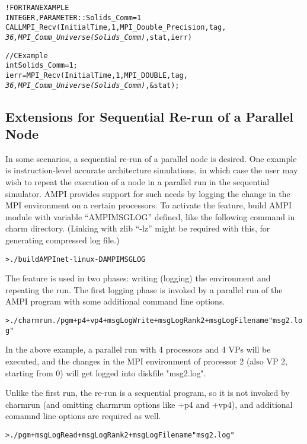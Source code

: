 \documentclass[10pt]{article}
\begin{document}
\begin{alltt}
!FORTRAN EXAMPLE
INTEGER , PARAMETER :: Solids_Comm = 1
CALL MPI_Recv(InitialTime, 1, MPI_Double_Precision, tag, 
              \emph{36, MPI_Comm_Universe(Solids_Comm)}, stat, ierr)

//C Example
int Solids_Comm = 1;
ierr = MPI_Recv(InitialTime, 1, MPI_DOUBLE, tag,
                \emph{36, MPI_Comm_Universe(Solids_Comm)}, &stat);
\end{alltt}

\subsection{Extensions for Sequential Re-run of a Parallel Node}
In some scenarios, a sequential re-run of a parallel node is desired. One
example is instruction-level accurate architecture simulations, in which case
the user may wish to repeat the execution of a node in a parallel run in the
sequential simulator. AMPI provides support for such needs by logging the change
in the MPI environment on a certain processors. To activate the feature, build 
AMPI module with variable ``AMPIMSGLOG'' defined, like the following command in
charm directory. (Linking with zlib ``-lz'' might be required with this, for
generating compressed log file.)

\begin{alltt}
> ./build AMPI net-linux -DAMPIMSGLOG
\end{alltt}

The feature is used in two phases: writing (logging) the environment and
repeating the run. The first logging phase is invoked by a parallel run of the
AMPI program with some additional command line options. 

\begin{alltt}
> ./charmrun ./pgm +p4 +vp4 +msgLogWrite +msgLogRank 2 +msgLogFilename "msg2.log"
\end{alltt}

In the above example, a parallel run with 4 processors and 4 VPs will be
executed, and the changes in the MPI environment of processor 2 (also VP 2,
starting from 0) will get logged into diskfile "msg2.log". 

Unlike the first run, the re-run is a sequential program, so it is not invoked
by charmrun (and omitting charmrun options like +p4 and +vp4), and additional
comamnd line options are required as well. 

\begin{alltt}
> ./pgm +msgLogRead +msgLogRank 2 +msgLogFilename "msg2.log"
\end{alltt}
\end{document}
